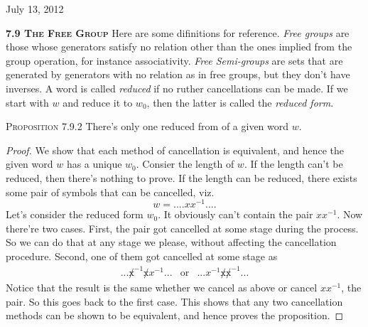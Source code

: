 \documentclass[12pt]{article}
\begin{document}
\begin{flushright} {\small July 13, 2012} \end{flushright}
\textbf {\textsc {7.9 The Free Group}}
Here are some difinitions for reference. \emph {Free groups} are those whose generators satisfy no relation other than the ones implied from the group operation, for instance associativity. \emph {Free Semi-groups} are sets that are generated by generators with no relation as in free groups, but they don't have inverses. A word is called \emph {reduced} if no ruther cancellations can be made. If we start with $w$ and reduce it to $w_{0}$, then the latter is called the \emph {reduced form}.
\par
\textsc {Proposition 7.9.2} There's only one reduced from of a given word $w$.
\begin{proof}
We show that each method of cancellation is equivalent, and hence the given word $w$ has a unique $w_{0}$. Consier the length of $w$. If the length can't be reduced, then there's nothing to prove. If the length can be reduced, there exists some pair of symbols that can be cancelled, viz. 
\begin{equation*}
w=....xx^{-1}....
\end{equation*}
Let's consider the reduced form $w_{0}$. It obviously can't contain the pair $xx^{-1}$. Now there're two cases. First, the pair got cancelled at some stage during the process. So we can do that at any stage we please, without affecting the cancellation procedure. Second, one of them got cancelled at some stage as
\begin{equation*}
\begin{array}{ccc}
...\not x^{-1} \not xx^{-1}... & \text {or} & ...x^{-1} \not x \not x^{-1}...
\end{array}
\end{equation*}
Notice that the result is the same whether we cancel as above or cancel $xx^{-1}$, the pair. So this goes back to the first case. This shows that any two cancellation methods can be shown to be equivalent, and hence proves the proposition.
\end{proof}
\end{document}
